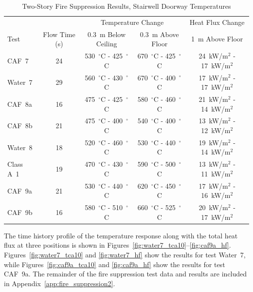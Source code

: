 \documentclass[12pt,oneside]{book}
\begin{document}
\begin{table}[!ht]
\centering
\caption{Two-Story Fire Suppression Results, Stairwell Doorway Temperatures}\label{tab:Test_Results_2}
\begin{tabular}{lcccc}
\toprule[1.5pt]
           &               & \multicolumn{2}{c}{Temperature Change}                                    & Heat Flux Change \\
Test 	   & Flow Time (s) & 0.3~m Below Ceiling                 & 0.3~m Above Floor	               & 1~m Above Floor \\
\midrule
CAF~7      & 24            & 530~$^{\circ}$C - 425~$^{\circ}$C   & 670~$^{\circ}$C - 425~$^{\circ}$C   & 24~kW/m$^2$ - 17~kW/m$^2$  \\[.25cm]
Water~7    & 29            & 560~$^{\circ}$C - 430~$^{\circ}$C   & 670~$^{\circ}$C - 400~$^{\circ}$C   & 17~kW/m$^2$ - 17~kW/m$^2$  \\[.25cm]
CAF~8a     & 16            & 475~$^{\circ}$C - 425~$^{\circ}$C   & 580~$^{\circ}$C - 460~$^{\circ}$C   & 21~kW/m$^2$ - 14~kW/m$^2$  \\
CAF~8b     & 21            & 475~$^{\circ}$C - 400~$^{\circ}$C   & 540~$^{\circ}$C - 400~$^{\circ}$C   & 13~kW/m$^2$ - 12~kW/m$^2$  \\[.25cm]
Water~8    & 18            & 520~$^{\circ}$C - 460~$^{\circ}$C   & 530~$^{\circ}$C - 440~$^{\circ}$C   & 19~kW/m$^2$ - 14~kW/m$^2$  \\[.25cm]
Class A~1  & 19            & 470~$^{\circ}$C - 430~$^{\circ}$C   & 590~$^{\circ}$C - 500~$^{\circ}$C   & 13~kW/m$^2$ - 11~kW/m$^2$  \\
CAF~9a     & 21            & 530~$^{\circ}$C - 440~$^{\circ}$C   & 620~$^{\circ}$C - 450~$^{\circ}$C   & 17~kW/m$^2$ - 16~kW/m$^2$  \\
CAF~9b     & 16            & 580~$^{\circ}$C - 510~$^{\circ}$C   & 660~$^{\circ}$C - 525~$^{\circ}$C   & 20~kW/m$^2$ - 17~kW/m$^2$  \\
\bottomrule[1.25pt]
\end{tabular}\par
\end{table}

The time history profile of the temperature response along with the total heat flux at three positions is shown in Figures~\ref{fig:water7_tca10}--\ref{fig:caf9a_hf}. Figures~\ref{fig:water7_tca10} and \ref{fig:water7_hf} show the results for test Water~7, while Figures~\ref{fig:caf9a_tca10} and \ref{fig:caf9a_hf} show the results for test CAF~9a. The remainder of the fire suppression test data and results are included in Appendix~\ref{app:fire_suppression2}.
\end{document}
